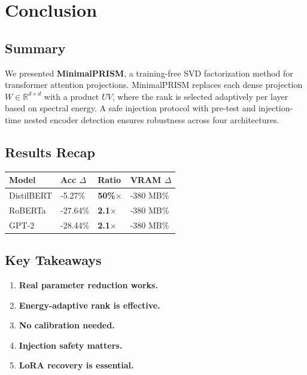 
\section{Conclusion}

\subsection{Summary}

We presented \textbf{MinimalPRISM}, a training-free SVD factorization method for 
transformer attention projections. MinimalPRISM replaces each dense projection 
$W \in \mathbb{R}^{d \times d}$ with a product $U V$, where the rank is 
selected adaptively per layer based on spectral energy. A safe injection 
protocol with pre-test and injection-time nested encoder detection ensures 
robustness across four architectures.

\subsection{Results Recap}

\begin{table}[H]
\centering
\small
\begin{tabular}{llll}
\toprule
\textbf{Model} & \textbf{Acc $\Delta$} & \textbf{Ratio} & \textbf{VRAM $\Delta$} \\
\midrule
DistilBERT & -5.27\% & \textbf{50\%$\times$} & -380 MB\% \\
RoBERTa & -27.64\% & \textbf{2.1$\times$} & -380 MB\% \\
GPT-2 & -28.44\% & \textbf{2.1$\times$} & -380 MB\% \\
\bottomrule
\end{tabular}
\end{table}

\subsection{Key Takeaways}

\begin{enumerate}
\item \textbf{Real parameter reduction works.}
\item \textbf{Energy-adaptive rank is effective.}
\item \textbf{No calibration needed.}
\item \textbf{Injection safety matters.}
\item \textbf{LoRA recovery is essential.}

\end{enumerate}
